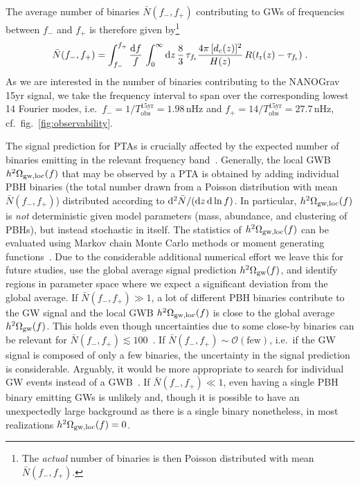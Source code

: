 The average number of binaries $\bar{N} (f_-, f_+)$ contributing to \acp{GW} of frequencies between $f_-$ and $f_+$ is therefore given by\footnote{The \textit{actual} number of binaries is then Poisson distributed with mean $\bar{N} (f_-, f_+)$.}
\begin{align}
	\bar{N} (f_-, f_+) = \int_{f_-}^{f_+} \frac{\mathrm{d} f}{f} \, \int_0^\infty \mathrm{d} z \, \frac{8}{3} \, \tau_{f_\text{r}} \frac{4 \pi \, [d_c(z)]^2}{H(z)} \, R (t_\text{r}(z) - \tau_{f_\text{r}})\;.
\end{align}
As we are interested in the number of binaries contributing to the \ac{NANOGrav} 15yr signal, we take the frequency interval to span over the corresponding lowest 14 Fourier modes, i.e.~$f_- = 1/T_\text{obs}^\text{15yr} = 1.98 \, \text{nHz}$ and $f_+ = 14/T_\text{obs}^\text{15yr} = 27.7 \, \text{nHz}$, cf.~fig.~\ref{fig:observability}.

The signal prediction for \acp{PTA} is crucially affected by the expected number of binaries emitting in the relevant frequency band~\cite{Ellis:2023owy}. Generally, the local \ac{GWB} $h^2 \Omega_{\text{gw}, \mathrm{loc}} (f)$ that may be observed by a \ac{PTA} is obtained by adding individual PBH binaries (the total number drawn from a Poisson distribution with mean $\bar{N} (f_-, f_+)$) distributed according to $\mathrm{d}^2 \bar{N} / (\mathrm{d} z \, \mathrm{d} \ln f)$. In particular, $h^2 \Omega_{\text{gw}, \mathrm{loc}}(f)$ is \textit{not} deterministic given model parameters (mass, abundance, and clustering of \acp{PBH}), but instead stochastic in itself. The statistics of $h^2 \Omega_{\text{gw}, \mathrm{loc}}(f)$ can be evaluated using Markov chain Monte Carlo methods or moment generating functions~\cite{Ellis:2023owy}. Due to the considerable additional numerical effort we leave this for future studies, use the global average signal prediction $h^2 \Omega_{\text{gw}} (f)$, and identify regions in parameter space where we  expect a significant deviation from the global average. If $\bar{N} (f_-, f_+) \gg 1$, a lot of different PBH binaries contribute to the \ac{GW} signal and the local \ac{GWB} $h^2 \Omega_{\text{gw}, \mathrm{loc}} (f)$ is close to the global average $h^2 \Omega_{\text{gw}} (f)$. This holds even though uncertainties due to some close-by binaries can be relevant for $\bar{N} (f_-, f_+) \lesssim 100$~\cite{Ellis:2023owy}. If $\bar{N} (f_-, f_+) \sim \mathcal{O} (\mathrm{few})$, i.e.~if the \ac{GW} signal is composed of only a few binaries, the uncertainty in the signal prediction is considerable. Arguably, it would be more appropriate to search for individual \ac{GW} events instead of a \ac{GWB}~\cite{IPTA:2023ero,Antoniadis:2023aac,NANOGrav:2023pdq}. If $\bar{N} (f_-, f_+) \ll 1$, even having a single \ac{PBH} binary emitting \acp{GW} is unlikely and, though it is possible to have an unexpectedly large background as there is a single binary nonetheless, in most realizations $h^2 \Omega_{\text{gw}, \mathrm{loc}} (f) = 0$.

